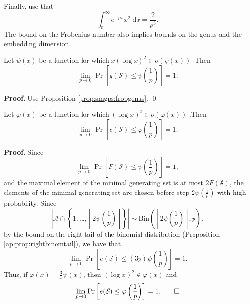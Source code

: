 Finally, use that 
\[\int_0^\infty e^{-px} x^2 \;\mathrm{d}x = \frac{2}{p^3}.\]
The bound on the Frobenius number also implies bounds on the genus and the embedding dimension.
\begin{corollary}
    Let $\psi(x)$ be a function for which $x(\log x)^2 \in o(\psi(x))$ .Then
    \[\lim_{p \to 0}\Pr\left[g(\mathcal{S}) \leq \psi\left(\frac{1}{p}\right)\right] = 1.\]
\end{corollary}
\textbf{Proof. } Use Proposition \ref{prop:smgps:frobgenus}. \qed
\begin{corollary}
    Let $\varphi(x)$ be a function for which $(\log x)^2 \in o(\varphi(x))$ .Then
    \[\lim_{p \to 0}\Pr\left[e(\mathcal{S}) \leq \varphi\left(\frac{1}{p}\right)\right] = 1.\]
\end{corollary}
\textbf{Proof. } Since
\[\lim_{p \to 0}\Pr\left[F(\mathcal{S}) \leq \psi\left(\frac{1}{p}\right)\right] = 1,\]
and the maximal element of the minimal generating set is at most $2F(\mathcal{S})$, the elements of the minimal generating set are chosen before step $2\psi\left(\frac{1}{p}\right)$ with high probability. Since \[\left|\mathcal{A}\cap\left\{1, \ldots, \left\lfloor2\psi\left(\frac{1}{p}\right)\right \rfloor\right\}\right| \sim \mathrm{Bin}\left(\left\lfloor2\psi\left(\frac{1}{p}\right)\right \rfloor, p\right),\] by the bound on the right tail of the binomial distribution (Proposition \ref{ap:prop:rightbinomtail}), we have that
\[\lim_{p \to 0}\Pr\left[e(\mathcal{S}) \leq (3p)\psi\left(\frac{1}{p}\right)\right] = 1.\]
Thus, if $\varphi(x) = \frac{3}{x} \psi\left(x\right)$, then $(\log x)^2 \in \varphi(x)$ and 
\[\lim_{p \to 0}\Pr\left[e(\mathcal{S}) \leq \varphi\left(\frac{1}{p}\right)\right] = 1.\qed \]
